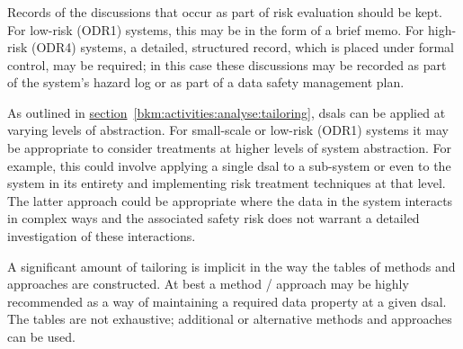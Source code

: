 \subsubsection{}
Records of the discussions that occur as part of risk evaluation should be kept. For low-risk (ODR1) systems, this may be in the form of a brief memo. For high-risk (ODR4) systems, a detailed, structured record, which is placed under formal control, may be required; in this case these discussions may be recorded as part of the system's \gls{hazard log} or as part of a data safety management plan.

As outlined in
\hyperref[bkm:activities:analyse:tailoring]{section}~\ref{bkm:activities:analyse:tailoring}, %
\glspl{dsal} can be applied at varying levels of abstraction. For small-scale or low-risk (ODR1) systems it may be appropriate to consider \glspl{treatment} at higher levels of system abstraction. For example, this could involve applying a single \gls{dsal} to a sub-system or even to the system in its entirety and implementing risk \gls{treatment} techniques at that level. The latter approach could be appropriate where the data in the system interacts in complex ways and the associated safety risk does not warrant a detailed investigation of these interactions.

A significant amount of \gls{tailoring} is implicit in the way the tables of methods and approaches are constructed. At best a method / approach may be highly recommended as a way of maintaining a required data property at a given \gls{dsal}. The tables are not exhaustive; additional or alternative methods and approaches can be used.
